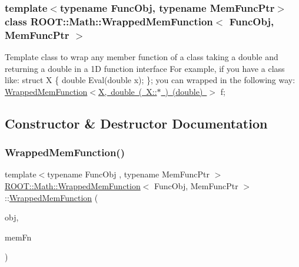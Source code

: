 \subsubsection*{template$<$typename Func\+Obj, typename Mem\+Func\+Ptr$>$\newline
class R\+O\+O\+T\+::\+Math\+::\+Wrapped\+Mem\+Function$<$ Func\+Obj, Mem\+Func\+Ptr $>$}

Template class to wrap any member function of a class taking a double and returning a double in a 1D function interface For example, if you have a class like\+: struct X \{ double Eval(double x); \}; you can wrapped in the following way\+: \mbox{\hyperlink{classROOT_1_1Math_1_1WrappedMemFunction_aae43e563f02bf4c9a2a833ff13c60234}{Wrapped\+Mem\+Function$<$\+X, double ( X\+::$\ast$ ) (double) $>$}} f; 

\subsection{Constructor \& Destructor Documentation}
\mbox{\label{classROOT_1_1Math_1_1WrappedMemFunction_aae43e563f02bf4c9a2a833ff13c60234}} 
\subsubsection{\texorpdfstring{WrappedMemFunction()}{WrappedMemFunction()}\hspace{0.1cm}{\footnotesize\ttfamily [1/3]}}
{\footnotesize\ttfamily template$<$typename Func\+Obj , typename Mem\+Func\+Ptr $>$ \\
\mbox{\hyperlink{classROOT_1_1Math_1_1WrappedMemFunction}{R\+O\+O\+T\+::\+Math\+::\+Wrapped\+Mem\+Function}}$<$ Func\+Obj, Mem\+Func\+Ptr $>$\+::\mbox{\hyperlink{classROOT_1_1Math_1_1WrappedMemFunction}{Wrapped\+Mem\+Function}} (\begin{DoxyParamCaption}\item[{Func\+Obj \&}]{obj,  }\item[{Mem\+Func\+Ptr}]{mem\+Fn }\end{DoxyParamCaption})\hspace{0.3cm}{\ttfamily [inline]}}

